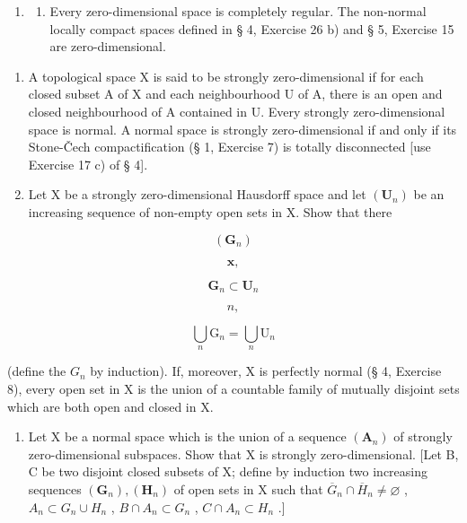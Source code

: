 \ExerciseSection

\begin{enumerate}
\def\labelenumi{\arabic{enumi})}
\tightlist
\item
  \begin{enumerate}
  \def\labelenumii{\alph{enumii})}
  \tightlist
  \item
    Every zero-dimensional space is completely regular. The non-normal locally compact spaces defined in § 4, Exercise 26 b) and § 5, Exercise 15 are zero-dimensional.
  \end{enumerate}
\end{enumerate}

\begin{enumerate}
\def\labelenumi{\alph{enumi})}
\setcounter{enumi}{1}
\item
  A topological space X is said to be strongly zero-dimensional if for each closed subset A of X and each neighbourhood U of A, there is an open and closed neighbourhood of A contained in U. Every strongly zero-dimensional space is normal. A normal space is strongly zero-dimensional if and only if its Stone-Čech compactification (§ 1, Exercise 7) is totally disconnected {[}use Exercise 17 c) of § 4{]}.
\item
  Let X be a strongly zero-dimensional Hausdorff space and let \((\mathbf{U}_{n})\) be an increasing sequence of non-empty open sets in X. Show that there
\end{enumerate}

\[
\left(\mathbf {G} _ {n}\right)
\]

\[
\mathbf {x},
\]

\[
\mathbf {G} _ {n} \subset \mathbf {U} _ {n}
\]

\[
n,
\]

\[
\bigcup_ {n} \mathrm{G} _ {n} = \bigcup_ {n} \mathrm{U} _ {n}
\]

(define the \(G_{n}\) by induction). If, moreover, X is perfectly normal (§ 4, Exercise 8), every open set in X is the union of a countable family of mutually disjoint sets which are both open and closed in X.

\begin{enumerate}
\def\labelenumi{\alph{enumi})}
\setcounter{enumi}{3}
\tightlist
\item
  Let X be a normal space which is the union of a sequence \((\mathbf{A}_{n})\) of strongly zero-dimensional subspaces. Show that X is strongly zero-dimensional. {[}Let B, C be two disjoint closed subsets of X; define by induction two increasing sequences \((\mathbf{G}_{n}), (\mathbf{H}_{n})\) of open sets in X such that \(\overline{G}_{n} \cap \overline{H}_{n} \neq \varnothing\) , \(A_{n} \subset G_{n} \cup H_{n}\) , \(B \cap A_{n} \subset G_{n}\) , \(C \cap A_{n} \subset H_{n}\) .{]}
\end{enumerate}

